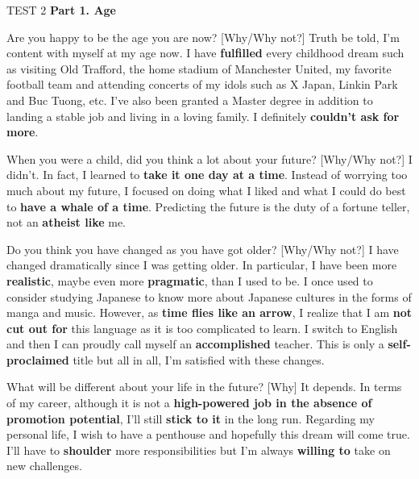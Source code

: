 \begin{glossarymc}[Cambridge 13]
    \begin{test}{TEST 2}
    \noindent
    \textbf{Part 1. Age}
    \begin{qa}{Are you happy to be the age you are now? [Why/Why not?]}
    Truth be told, I’m content with myself at my age now. I have \textbf{fulfilled} every childhood dream such as visiting Old Trafford, the home stadium of Manchester United, my favorite football team and attending concerts of my idols such as X Japan, Linkin Park and Buc Tuong, etc. I’ve also been granted a Master degree in addition to landing a stable job and living in a loving family. I definitely \textbf{couldn’t ask for more}.
    \end{qa}

    \begin{qa}{When you were a child, did you think a lot about your future? [Why/Why not?]}
    I didn’t. In fact, I learned to \textbf{take it one day at a time}. Instead of worrying too much about my future, I focused on doing what I liked and what I could do best to \textbf{have a whale of a time}. Predicting the future is the duty of a fortune teller, not an \textbf{atheist like} me.
    \end{qa}

    \begin{qa}{Do you think you have changed as you have got older? [Why/Why not?]}
    I have changed dramatically since I was getting older. In particular, I have been more \textbf{realistic}, maybe even more \textbf{pragmatic}, than I used to be. I once used to consider studying Japanese to know more about Japanese cultures in the forms of manga and music. However, as \textbf{time flies like an arrow}, I realize that I am \textbf{not cut out for} this language as it is too complicated to learn. I switch to English and then I can proudly call myself an \textbf{accomplished} teacher. This is only a \textbf{self-proclaimed} title but all in all, I’m satisfied with these changes.
    \end{qa}

    \begin{qa}{What will be different about your life in the future? [Why]}
    It depends. In terms of my career, although it is not a \textbf{high-powered job in the absence of promotion potential}, I’ll still \textbf{stick to it} in the long run. Regarding my personal life, I wish to have a penthouse and hopefully this dream will come true. I’ll have to \textbf{shoulder} more responsibilities but I’m always \textbf{willing to} take on new challenges.
    \end{qa}


\end{test}
\end{glossarymc}
